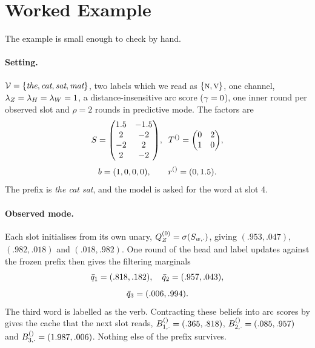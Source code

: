 \section{Worked Example}
\label{app:worked-example}

The example is small enough to check by hand.

\paragraph{Setting.}
$\mathcal{V} = \{\textit{the}, \textit{cat}, \textit{sat}, \textit{mat}\}$, two labels which we read
as $\{\textsc{n}, \textsc{v}\}$, one channel, $\lambda_Z = \lambda_H = \lambda_W = 1$, a
distance-insensitive arc score ($\gamma = 0$), one inner round per observed slot and $\rho = 2$
rounds in predictive mode. The factors are
%
\[
  S = \begin{pmatrix} 1.5 & -1.5 \\ 2 & -2 \\ -2 & 2 \\ 2 & -2 \end{pmatrix}\!,\;\;
  T^{()} = \begin{pmatrix} 0 & 2 \\ 1 & 0 \end{pmatrix}\!,
\]
\[
  b = (1,0,0,0), \qquad r^{()} = (0, 1.5).
\]
%
The prefix is \textit{the cat sat}, and the model is asked for the word at slot 4.

\paragraph{Observed mode.}
Each slot initialises from its own unary, $Q_{Z_{}}^{(0)} = \sigma(S_{w,\cdot})$, giving
$(.953,.047)$, $(.982,.018)$ and $(.018,.982)$. One round of the head and label updates against
the frozen prefix then gives the filtering marginals
%
\[
  \bar{q}_{1} = (.818,.182), \quad \bar{q}_{2} = (.957,.043),
\]
\vspace{-1.2em}
\[
  \bar{q}_{3} = (.006,.994).
\]
%
The third word is labelled as the verb. Contracting these beliefs into arc scores by
 gives the cache that the next slot reads,
$B^{()}_{1,\cdot} = (.365,.818)$, $B^{()}_{2,\cdot} = (.085,.957)$ and
$B^{()}_{3,\cdot} = (1.987,.006)$. Nothing else of the prefix survives.

